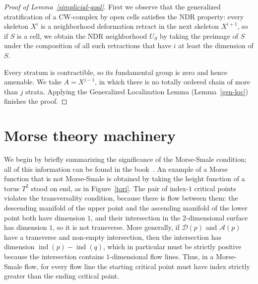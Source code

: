 \documentclass[psamsfonts]{amsart}
\theoremstyle{remark}
\DeclareMathOperator{\ind}{ind}
\begin{document}
\begin{proof}[Proof of Lemma~\ref{simplicial-goal}]
First we observe that the generalized stratification of a CW-complex by open cells satisfies the NDR property: every skeleton $X^i$ is a neighborhood deformation retract in the next skeleton $X^{i+1}$, so if $S$ is a cell, we obtain the NDR neighborhood $U_S$ by taking the preimage of $S$ under the composition of all such retractions that have $i$ at least the dimension of $S$.

Every stratum is contractible, so its fundamental group is zero and hence amenable.  We take $A = X^{j-1}$, in which there is no totally ordered chain of more than $j$ strata.  Applying the Generalized Localization Lemma (Lemma~\ref{gen-loc}) finishes the proof.
\end{proof}

\section{Morse theory machinery}\label{morse}

We begin by briefly summarizing the significance of the Morse-Smale condition; all of this information can be found in the book~\cite{Banyaga04}.  An example of a Morse function that is not Morse-Smale is obtained by taking the height function of a torus $T^2$ stood on end, as in Figure~\ref{tori}.  The pair of index-$1$ critical points violates the transversality condition, because there is flow between them: the descending manifold of the upper point and the ascending manifold of the lower point both have dimension $1$, and their intersection in the $2$-dimensional surface has dimension $1$, so it is not transverse.  More generally, if $\mathcal{D}(p)$ and $\mathcal{A}(p)$ have a transverse and non-empty intersection, then the intersection has dimension $\ind(p) - \ind(q)$, which in particular must be strictly positive because the intersection contains $1$-dimensional flow lines.  Thus, in a Morse-Smale flow, for every flow line the starting critical point must have index strictly greater than the ending critical point.
\end{document}

